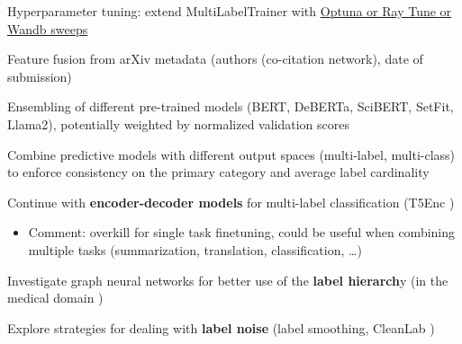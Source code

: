 \documentclass[11pt,letterpaper]{article}
\begin{document}
\begin{todolist}
\item Hyperparameter tuning: extend MultiLabelTrainer with \href{https://huggingface.co/docs/transformers/en/hpo_train}{Optuna or Ray Tune or Wandb sweeps}
\item Feature fusion from arXiv metadata (\eg authors (co-citation network), date of submission)
\item Ensembling of different pre-trained models (\eg BERT, DeBERTa, SciBERT, SetFit, Llama2), potentially weighted by normalized validation scores
\item Combine predictive models with different output spaces (\eg multi-label, multi-class) to enforce consistency on the primary category and average label cardinality
\item Continue with \textbf{encoder-decoder models} for multi-label classification (\eg T5Enc \cite{kementchedjhieva2023exploration})
\begin{itemize}
  \item Comment: overkill for single task finetuning, could be useful when combining multiple tasks (summarization, translation, classification, \ldots)
\end{itemize}
\item Investigate graph neural networks for better use of the \textbf{label hierarch}y (\eg in the medical domain \cite{chi2024graph})
\item Explore strategies for dealing with \textbf{label noise} (\eg label smoothing, CleanLab \cite{kumar2020robust,oyen2022robustness})
\end{todolist}

{\small


}
\end{document}
